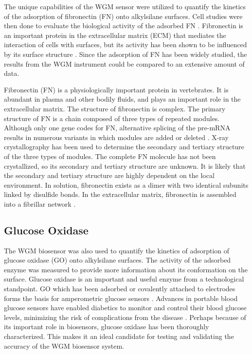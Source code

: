 The unique capabilities of the WGM sensor were utilized to quantify
the kinetics of the adsorption of fibronectin (FN) onto alkylsilane
surfaces. Cell studies were then done to evaluate the biological activity
of the adsorbed FN \cite{Keselowsky2004}. Fibronectin is an important
protein in the extracellular matrix (ECM) that mediates the interaction
of cells with surfaces, but its activity has been shown to be influenced
by its surface structure \cite{Lan2005,Michael2003}. Since the adsorption
of FN has been widely studied, the results from the WGM instrument
could be compared to an extensive amount of data. 

Fibronectin (FN) is a physiologically important protein in vertebrates.
It is abundant in plasma and other bodily fluids, and plays an important
role in the extracellular matrix. The structure of fibronectin is
complex. The primary structure of FN is a chain composed of three
types of repeated modules. Although only one gene codes for FN, alternative
splicing of the pre-mRNA results in numerous variants in which modules
are added or deleted \cite{Pankov2002}. X-ray crystallography has
been used to determine the secondary and tertiary structure of the
three types of modules. The complete FN molecule has not been crystallized,
so its secondary and tertiary structure are unknown. It is likely
that the secondary and tertiary structure are highly dependent on
the local environment. In solution, fibronectin exists as a dimer
with two identical subunits linked by disulfide bonds. In the extracellular
matrix, fibronectin is assembled into a fibrillar network \cite{Mao2005}.


\subsection{Glucose Oxidase}

The WGM biosensor was also used to quantify the kinetics of adsorption
of glucose oxidase (GO) onto alkylsilane surfaces. The activity of
the adsorbed enzyme was measured to provide more information about
its conformation on the surface. Glucose oxidase is an important and
useful enzyme from a technological standpoint. GO which has been adsorbed
or covalently attached to electrodes forms the basis for amperometric
glucose sensors \cite{Wang2007}. Advances in portable blood glucose
sensors have enabled diabetics to monitor and control their blood
glucose levels, minimizing the risk of complications from the disease
\cite{Oliver2009}. Perhaps because of its important role in biosensors,
glucose oxidase has been thoroughly characterized. This makes it an
ideal candidate for testing and validating the accuracy of the WGM
biosensor system. 

